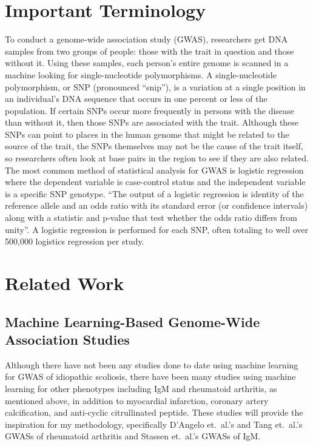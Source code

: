 \documentclass[12pt]{report}
\begin{document}
\section{Important Terminology}
To conduct a genome-wide association study (GWAS), researchers get DNA samples from two
groups of people: those with the trait in question and those without it. Using
these samples, each person's entire genome is scanned in a machine looking for
single-nucleotide polymorphisms. A single-nucleotide polymorphism, or SNP
(pronounced ``snip''), is a variation at a single position in an individual's
DNA sequence that occurs in one percent or less of the population. If certain
SNPs occur more frequently in persons with the disease than without it, then
those SNPs are associated with the trait. Although these SNPs can point to places
in the human genome that might be related to the source of the trait, the SNPs
themselves may not be the cause of the trait itself, so researchers often look
at base pairs in the region to see if they are also related\cite{NatureEducat}.
The most common method of statistical analysis for GWAS is logistic regression
where the dependent variable is case-control status and the independent variable
is a specific SNP genotype. ``The output of a logistic regression is identity of
the reference allele and an odds ratio with its standard error (or confidence
intervals) along with a statistic and p-value that test whether the odds ratio
differs from unity''\cite{Corvin2010}. A logistic regression is performed for
each SNP, often totaling to well over 500,000 logistics regression per study.

\section{Related Work}
\subsection{Machine Learning-Based Genome-Wide Association Studies}
Although there have not been any studies done to date using machine learning for
GWAS of idiopathic scoliosis, there have been many studies using machine learning
for other phenotypes including IgM and rheumatoid arthritis, as mentioned above,
in addition to myocardial infarction, coronary artery calcification, and anti-cyclic
citrullinated peptide\cite{Szymczak2016}. These studies will provide the inspiration
for my methodology, specifically D’Angelo et.\ al.’s\cite{DAngelo2009} and Tang
et.\ al.’s\cite{Tang2009} GWASs of rheumatoid arthritis and Stassen et.\ al.’s
GWASs of IgM.
\end{document}
